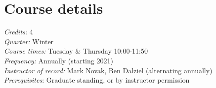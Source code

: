 \documentclass[10pt]{article}
\begin{document}
\section*{Course details}
\emph{Credits:} 4\\
\emph{Quarter:} Winter\\
\emph{Course times:} Tuesday \& Thursday 10:00-11:50\\
\emph{Frequency:} Annually (starting 2021)\\
\emph{Instructor of record:} Mark Novak, Ben Dalziel (alternating annually)\\
\emph{Prerequisites}: Graduate standing, or by instructor permission\\
\end{document}
